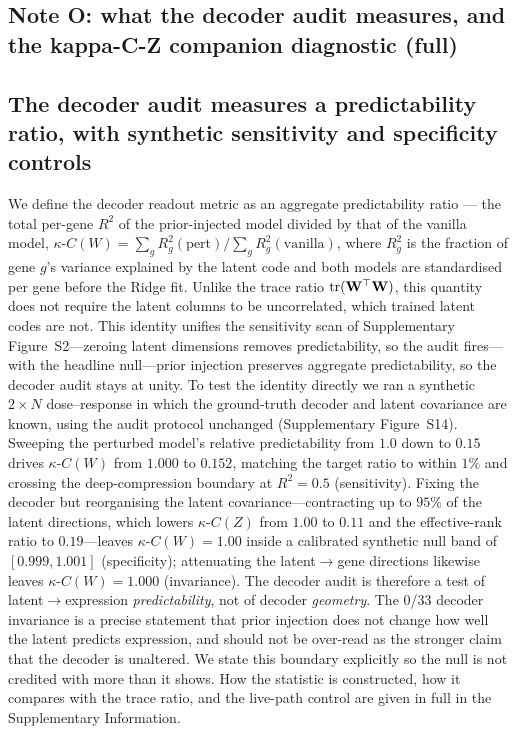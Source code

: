 \documentclass[11 pt,a4 paper]{article}
\begin{document}
\subsection*{Note O: what the decoder audit measures, and the kappa-C-Z companion diagnostic (full)}

\subsection*{The decoder audit measures a predictability ratio, with synthetic sensitivity and specificity controls}
\label{sec:predictability}

We define the decoder readout metric as an aggregate predictability ratio --- the total per-gene $R^2$ of the prior-injected model divided by that of the vanilla model, $\kappa\text{-}C(W)=\allowbreak\sum_g R^2_g(\text{pert})\big/\sum_g R^2_g(\text{vanilla})$, where $R^2_g$ is the fraction of gene $g$'s variance explained by the latent code and both models are standardised per gene before the Ridge fit. Unlike the trace ratio $\operatorname{tr}(\mathbf{W}^\top\mathbf{W})$, this quantity does not require the latent columns to be uncorrelated, which trained latent codes are not. This identity unifies the sensitivity scan of Supplementary Figure~S2---zeroing latent dimensions removes predictability, so the audit fires---with the headline null---prior injection preserves aggregate predictability, so the decoder audit stays at unity. To test the identity directly we ran a synthetic $2\times N$ dose--response in which the ground-truth decoder and latent covariance are known, using the audit protocol unchanged (Supplementary Figure~S14). Sweeping the perturbed model's relative predictability from $1.0$ down to $0.15$ drives $\kappa$-$C(W)$ from $1.000$ to $0.152$, matching the target ratio to within $1\%$ and crossing the deep-compression boundary at $R^2=0.5$ (sensitivity). Fixing the decoder but reorganising the latent covariance---contracting up to $95\%$ of the latent directions, which lowers $\kappa$-$C(Z)$ from $1.00$ to $0.11$ and the effective-rank ratio to $0.19$---leaves $\kappa$-$C(W)=1.00$ inside a calibrated synthetic null band of $[0.999,1.001]$ (specificity); attenuating the latent$\to$gene directions likewise leaves $\kappa$-$C(W)=1.000$ (invariance). The decoder audit is therefore a test of latent$\to$expression \emph{predictability}, not of decoder \emph{geometry}. The 0/33 decoder invariance is a precise statement that prior injection does not change how well the latent predicts expression, and should not be over-read as the stronger claim that the decoder is unaltered. We state this boundary explicitly so the null is not credited with more than it shows. How the statistic is constructed, how it compares with the trace ratio, and the live-path control are given in full in the Supplementary Information.
\end{document}
